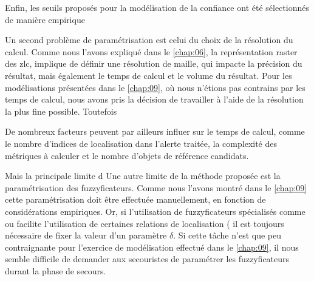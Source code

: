 
Enfin, les seuils proposés pour la modélisation de la confiance ont
été sélectionnés de manière empirique


Un second problème de paramétrisation est celui du choix de la
résolution du calcul. Comme nous l'avons expliqué dans le
\autoref{chap:06}, la représentation raster des \ac{zlc}, implique de
définir une résolution de maille, qui impacte la précision du
résultat, mais également le temps de calcul et le volume du
résultat. Pour les modélisations présentées dans le \autoref{chap:09},
où nous n'étions pas contrains par les temps de calcul, nous avons
pris la décision de travailler à l'aide de la résolution la plus fine
possible. Toutefois


De nombreux facteurs peuvent par ailleurs influer sur le temps de
calcul, comme le nombre d'indices de localisation dans l'alerte
traitée, la complexité des métriques à calculer et le nombre d'objets
de référence candidats.


Mais la principale limite d
%
Une autre limite de la méthode proposée est la paramétrisation des
fuzzyficateurs. Comme nous l'avons montré dans le \autoref{chap:09}
cette paramétrisation doit être effectuée manuellement, en fonction de
considérations empiriques. Or, si l'utilisation de fuzzyficateurs
spécialisés comme  ou 
facilite l'utilisation de certaines relations de localisation (\eg
{} il est toujours nécessaire de fixer la valeur
d'un paramètre \(\delta\). Si cette tâche n'est que peu contraignante
pour l'exercice de modélisation effectué dans le \autoref{chap:09}, il
nous semble difficile de demander aux secouristes de paramétrer les
fuzzyficateurs durant la phase de secours.

